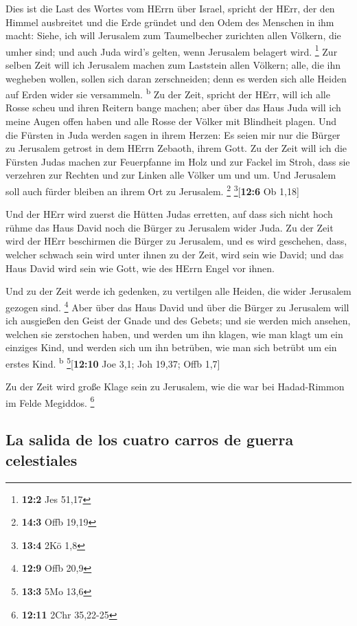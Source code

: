  Dies ist die Last des Wortes vom HErrn über Israel,
spricht der HErr, der den Himmel ausbreitet und die Erde gründet und den
Odem des Menschen in ihm macht:  Siehe, ich will Jerusalem
zum Taumelbecher zurichten allen Völkern, die umher sind; und auch Juda
wird's gelten, wenn Jerusalem belagert wird. \footnote{\textbf{12:2} Jes
  51,17}  Zur selben Zeit will ich Jerusalem machen zum
Laststein allen Völkern; alle, die ihn wegheben wollen, sollen sich
daran zerschneiden; denn es werden sich alle Heiden auf Erden wider sie
versammeln. \textsuperscript{b}  Zu der Zeit, spricht der
HErr, will ich alle Rosse scheu und ihren Reitern bange machen; aber
über das Haus Juda will ich meine Augen offen haben und alle Rosse der
Völker mit Blindheit plagen.  Und die Fürsten in Juda
werden sagen in ihrem Herzen: Es seien mir nur die Bürger zu Jerusalem
getrost in dem HErrn Zebaoth, ihrem Gott.  Zu der Zeit
will ich die Fürsten Judas machen zur Feuerpfanne im Holz und zur Fackel
im Stroh, dass sie verzehren zur Rechten und zur Linken alle Völker um
und um. Und Jerusalem soll auch fürder bleiben an ihrem Ort zu
Jerusalem. \footnote{\textbf{14:3} Offb 19,19}
\footnote{\textbf{13:4} 2Kö 1,8}{[}\textbf{12:6} Ob 1,18{]}

 Und der HErr wird zuerst die Hütten Judas erretten, auf
dass sich nicht hoch rühme das Haus David noch die Bürger zu Jerusalem
wider Juda.  Zu der Zeit wird der HErr beschirmen die
Bürger zu Jerusalem, und es wird geschehen, dass, welcher schwach sein
wird unter ihnen zu der Zeit, wird sein wie David; und das Haus David
wird sein wie Gott, wie des HErrn Engel vor ihnen.

 Und zu der Zeit werde ich gedenken, zu vertilgen alle
Heiden, die wider Jerusalem gezogen sind. \footnote{\textbf{12:9} Offb
  20,9}  Aber über das Haus David und über die Bürger zu
Jerusalem will ich ausgießen den Geist der Gnade und des Gebets; und sie
werden mich ansehen, welchen sie zerstochen haben, und werden um ihn
klagen, wie man klagt um ein einziges Kind, und werden sich um ihn
betrüben, wie man sich betrübt um ein erstes Kind. \textsuperscript{b}
\footnote{\textbf{13:3} 5Mo 13,6}{[}\textbf{12:10} Joe 3,1; Joh 19,37;
Offb 1,7{]}

 Zu der Zeit wird große Klage sein zu Jerusalem, wie die
war bei Hadad-Rimmon im Felde Megiddos. \footnote{\textbf{12:11} 2Chr
  35,22-25}

\hypertarget{la-salida-de-los-cuatro-carros-de-guerra-celestiales}{%
\subsection{La salida de los cuatro carros de guerra
celestiales}\label{la-salida-de-los-cuatro-carros-de-guerra-celestiales}}


